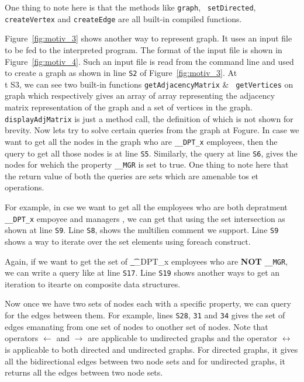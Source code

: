 \begin{example}
{  One thing to note here is that the methods like {\tt graph}, {\tt 
    setDirected}, {\tt createVertex} and {\tt createEdge} are all built-in 
    compiled functions. 

  
  
  Figure~\ref{fig:motiv_3} shows another way to represent graph.  
  It uses an input file to be fed to
  the interpreted program. The format of the input file is shown in 
  Figure~\ref{fig:motiv_4}. Such an input file is read from the command line and 
  used to create a graph as 
  shown in line {\tt S2} of Figure~\ref{fig:motiv_3}. At {\\t S3}, 
       we can see two built-in functions {\tt getAdjacencyMatrix} \& {\tt 
         getVertices} on graph
  which respectively gives an array of array representing the adjacency matrix 
  representation of the graph and a set of vertices in the graph. {\tt 
    displayAdjMatrix} is just a method call, the definition of which is not 
    shown for brevity. Now lets try to solve certain queries from the graph at 
    Fogure.
  In case we want to get all the nodes in the graph who are {\tt \_\_DPT\_x} 
  employees, then
  the query to get all those nodes is at line {\tt S5}. Similarly, the query at 
  line {\tt S6}, gives
  the nodes for wehich the property {\tt \_\_MGR} is set to true.  One thing to 
  note here that the return value of both the queries are sets which are 
  amenable tos et operations.

  For example, in cse we want to get all the employees who are both depratment 
  {\tt \_\_DPT\_x} empoyee and managers
  , we can get that using the set intersection as shown at line {\tt S9}. Line 
  {\tt S8}, shows the multilien comment we support. Line {\tt S9} shows a way to 
  iterate over the set elements using foreach construct.

  Again, if we want to get the  set of {\t \_\_DPT\_x} employees who are 
  \textbf{NOT} {\tt \_\_MGR},
  we can write a query like at line {\tt S17}. Line {\tt S19} shows another ways 
    to get an iteration to itearte on composite data structures. 

 Now once we have two sets of nodes each with a specific property, we can query 
 for the edges between them.
 For example, lines {\tt S28}, {\tt 31} and {\tt 34} gives the set of edges 
   emanating from one set of nodes
 to onother set of nodes. Note that operators $\leftarrow$ and $\rightarrow$ are 
 applicable to undirected graphs
 and the operator $\leftrightarrow$ is applicable to both directed and 
 undirected graphs. For directed graphs,
 it gives all the bidirectional edges between two node sets and for undirected 
   graphs, it returns all the edges between
   two node sets.
    \hfill\psframebox{}}
\end{example}

